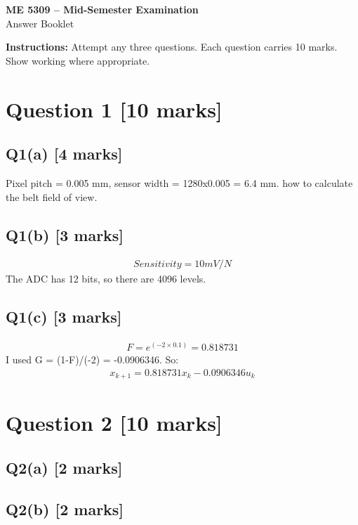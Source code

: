\documentclass[11pt,a4paper]{article}
\begin{document}
\begin{center}
{\Large\bfseries ME 5309 -- Mid-Semester Examination}\\[3pt]
{\large Answer Booklet}\\[8pt]
\end{center}
\textbf{Instructions:} Attempt any three questions. Each question carries 10 marks. Show working where appropriate.
\section*{Question 1 \hfill [10 marks]}
\subsection*{Q1(a) \hfill [4 marks]}

Pixel pitch = 0.005 mm, sensor width = 1280x0.005 = 6.4 mm. how to calculate the belt field of view.

\subsection*{Q1(b) \hfill [3 marks]}

\[\begin{aligned}Sensitivity = 10 mV/N\end{aligned}\]
The ADC has 12 bits, so there are 4096 levels.

\subsection*{Q1(c) \hfill [3 marks]}

\[\begin{aligned}F = e^(-2\times0.1) = 0.818731\end{aligned}\]
I used G = (1-F)/(-2) = -0.0906346.
So:\[\begin{aligned}x_{k+1} = 0.818731x_k - 0.0906346u_k\end{aligned}\]

\section*{Question 2 \hfill [10 marks]}
\subsection*{Q2(a) \hfill [2 marks]}

\vspace{2mm}

\subsection*{Q2(b) \hfill [2 marks]}
\end{document}
